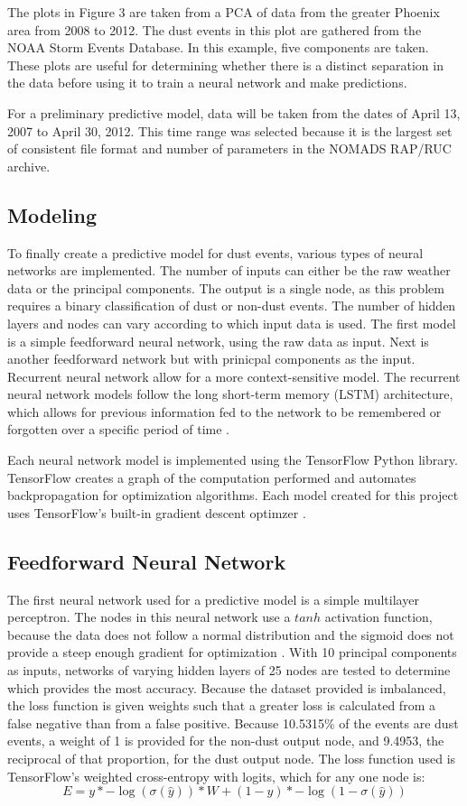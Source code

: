 \documentclass{article}
\begin{document}
The plots in Figure 3 are taken from a PCA of data from the greater Phoenix area from 2008 to 2012. The dust events in this plot are gathered from the NOAA Storm Events Database. In this example, five components are taken. These plots are useful for determining whether there is a distinct separation in the data before using it to train a neural network and make predictions. 

For a preliminary predictive model, data will be taken from the dates of April 13, 2007 to April 30, 2012. This time range was selected because it is the largest set of consistent file format and number of parameters in the NOMADS RAP/RUC archive. 

\subsection{Modeling}
To finally create a predictive model for dust events, various types of neural networks are implemented. The number of inputs can either be the raw weather data or the principal components. The output is a single node, as this problem requires a binary classification of dust or non-dust events. The number of hidden layers and nodes can vary according to which input data is used. The first model is a simple feedforward neural network, using the raw data as input. Next is another feedforward network but with prinicpal components as the input. Recurrent neural network allow for a more context-sensitive model. The recurrent neural network models follow the long short-term memory (LSTM) architecture, which allows for previous information fed to the network to be remembered or forgotten over a specific period of time \cite{rnn}.

Each neural network model is implemented using the TensorFlow Python library. TensorFlow creates a graph of the computation performed and automates backpropagation for optimization algorithms. Each model created for this project uses TensorFlow's built-in gradient descent optimzer \cite{tfdoc}.

\subsection{Feedforward Neural Network}
The first neural network used for a predictive model is a simple multilayer perceptron. The nodes in this neural network use a $tanh$ activation function, because the data does not follow a normal distribution and the sigmoid does not provide a steep enough gradient for optimization \cite{activation}. With 10 principal components as inputs, networks of varying hidden layers of 25 nodes are tested to determine which provides the most accuracy. Because the dataset provided is imbalanced, the loss function is given weights such that a greater loss is calculated from a false negative than from a false positive. Because 10.5315\% of the events are dust events, a weight of 1 is provided for the non-dust output node, and 9.4953, the reciprocal of that proportion, for the dust output node. The loss function used is TensorFlow's weighted cross-entropy with logits, which for any one node is:
$$E =y * -\log(\sigma(\hat y)) * W + (1-y)*-\log(1-\sigma(\hat y)) $$
\end{document}
